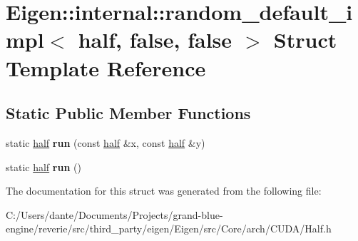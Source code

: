 \hypertarget{struct_eigen_1_1internal_1_1random__default__impl_3_01half_00_01false_00_01false_01_4}{}\section{Eigen\+::internal\+::random\+\_\+default\+\_\+impl$<$ half, false, false $>$ Struct Template Reference}
\label{struct_eigen_1_1internal_1_1random__default__impl_3_01half_00_01false_00_01false_01_4}
\subsection*{Static Public Member Functions}
\begin{DoxyCompactItemize}
\item 
\mbox{\label{struct_eigen_1_1internal_1_1random__default__impl_3_01half_00_01false_00_01false_01_4_aa4b9b3a615a7f3ea51a5464d407f81bd}} 
static \mbox{\hyperlink{struct_eigen_1_1half}{half}} {\bfseries run} (const \mbox{\hyperlink{struct_eigen_1_1half}{half}} \&x, const \mbox{\hyperlink{struct_eigen_1_1half}{half}} \&y)
\item 
\mbox{\label{struct_eigen_1_1internal_1_1random__default__impl_3_01half_00_01false_00_01false_01_4_aa412e9550f2904677f72b074ddde7cf8}} 
static \mbox{\hyperlink{struct_eigen_1_1half}{half}} {\bfseries run} ()
\end{DoxyCompactItemize}


The documentation for this struct was generated from the following file\+:\begin{DoxyCompactItemize}
\item 
C\+:/\+Users/dante/\+Documents/\+Projects/grand-\/blue-\/engine/reverie/src/third\+\_\+party/eigen/\+Eigen/src/\+Core/arch/\+C\+U\+D\+A/Half.\+h\end{DoxyCompactItemize}
